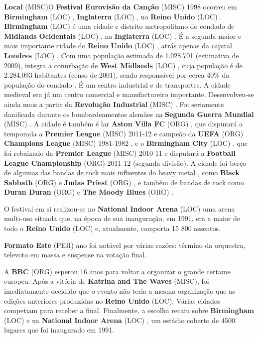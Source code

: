 \documentclass[12pt,a4paper]{article}
\begin{document}
\textbf{Local} (MISC)O \textbf{Festival Eurovisão da Canção} (MISC) 1998 ocorreu em \textbf{Birmingham} (LOC) , \textbf{Inglaterra} (LOC) , no \textbf{Reino Unido} (LOC) . \textbf{Birmingham} (LOC) é uma cidade e distrito metropolitano do condado de \textbf{Midlands Ocidentais} (LOC) , na \textbf{Inglaterra} (LOC) . É a segunda maior e mais importante cidade do \textbf{Reino Unido} (LOC) , atrás apenas da capital \textbf{Londres} (LOC) . Com uma população estimada de 1.028.701 (estimativa de 2009), integra a conurbação de \textbf{West Midlands} (LOC) , cuja população é de 2.284.093 habitantes (censo de 2001), sendo responsável por cerca 40\% da população do condado . É um centro industrial e de transportes. A cidade medieval era já um centro comercial e manufactureiro importante. Desenvolveu-se ainda mais a partir da \textbf{Revolução Industrial} (MISC) . Foi seriamente danificada durante os bombardeamentos alemães na \textbf{Segunda Guerra Mundial} (MISC) . A cidade é também é lar \textbf{Aston Villa FC} (ORG) , que dispurará a temporada a \textbf{Premier League} (MISC) 2011-12 e campeão da \textbf{UEFA} (ORG) \textbf{Champions League} (MISC) 1981-1982 , e o \textbf{Birmingham City} (LOC) , que foi rebaixado da \textbf{Premier League} (MISC) 2010-11 e disputará a \textbf{Football League Championship} (ORG) 2011-12 (segunda divisão). A cidade foi berço de algumas das bandas de rock mais influentes do heavy metal , como \textbf{Black Sabbath} (ORG) e \textbf{Judas Priest} (ORG) , e também de bandas de rock como \textbf{Duran Duran} (ORG) e \textbf{The Moody Blues} (ORG) .

O festival em si realizou-se no \textbf{National Indoor Arena} (LOC) uma arena multi-uso situada que, na época de sua inauguração, em 1991, era a maior de todo o \textbf{Reino Unido} (LOC) e, atualmente, comporta 15 800 assentos.



\textbf{Formato Este} (PER) ano foi notável por várias razões: término da orquestra, televoto em massa e suspense na votação final.

A \textbf{BBC} (ORG) esperou 16 anos para voltar a organizar o grande certame europeu. Após a vitória de \textbf{Katrina and The Waves} (MISC), foi imediatamente decidido que o evento não teria a mesma organização que as edições anteriores produzidas no \textbf{Reino Unido} (LOC). Várias cidades competiam para receber a final. Finalmente, a escolha recaiu sobre \textbf{Birmingham} (LOC) e na \textbf{National Indoor Arena} (LOC) , um estádio coberto de 4500 lugares que foi inaugurado em 1991.
\end{document}
